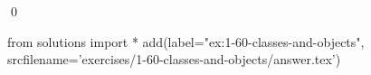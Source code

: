 
\begin{ex}
  \label{ex:1-60-classes-and-objects}
  
  \qed
\end{ex}
\begin{python0}
from solutions import *
add(label="ex:1-60-classes-and-objects",
    srcfilename='exercises/1-60-classes-and-objects/answer.tex')
\end{python0}

